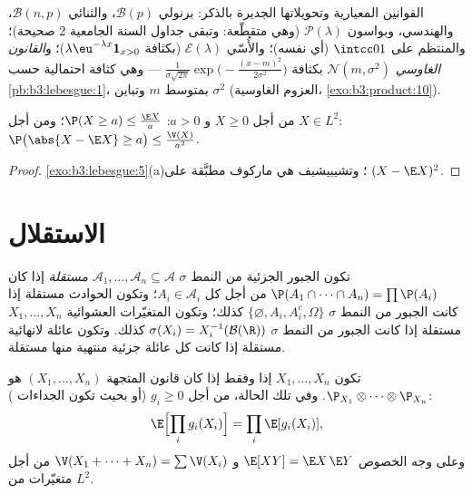 \begin{example}\label{ex:b3:probability:laws}
القوانين المعيارية وتحويلاتها الجديرة بالذكر: برنولي
$\mathcal B(p)$، والثنائي $\mathcal B(n, p)$، والهندسي، وبواسون $\mathcal P(\lambda)$
(وهي متقطّعة: وتبقى جداول السنة الجامعية 2 صحيحة)؛ والمنتظم
على $\intcc01$ (أي  نفسه)؛ والأُسّي $\mathcal E(\lambda)$ (بكثافة
$\lambda\eu^{-\lambda x}\mathbf 1_{x>0}$)؛ و\emph{القانون الغاوسي} $\mathcal N(m, \sigma^2)$
بكثافة $\frac1{\sigma\sqrt{2\pi}}\exp\bigl(-\frac{(x -
m)^2}{2\sigma^2}\bigr)$ --- وهي كثافة احتمالية حسب \cref{pb:b3:lebesgue:1}، بمتوسط $m$
وتباين $\sigma^2$ (العزوم الغاوسية، \cref{exo:b3:product:10}).
\end{example}

\begin{proposition}
\label{prop:b3:probability:markov}
من أجل $X \geq 0$ و $a > 0$: $\P(X \geq a) \leq \frac{\E
X}{a}$؛ ومن أجل $X \in L^2$:
$\P\bigl(\abs{X - \E X} \geq
a\bigr) \leq \frac{\V(X)}{a^2}$.
\end{proposition}

\begin{proof}
\cref{exo:b3:lebesgue:5}(a)؛ وتشيبيشيف هي ماركوف مطبَّقة على $(X - \E X)^2$.
\end{proof}

\section{الاستقلال}

\begin{definition}\label{def:b3:probability:independence}
تكون الجبور الجزئية من النمط $\sigma$ $\mathcal A_1, \dots, \mathcal A_n
\subseteq \mathcal A$
\emph{مستقلة} إذا كان $\P(A_1\cap\dots\cap A_n) = \prod\P(A_i)$ من أجل كل $A_i \in
\mathcal A_i$؛
وتكون الحوادث مستقلة إذا كانت الجبور من النمط $\sigma$ $\{\varnothing, A_i, A_i^c, \Omega\}$
كذلك؛ وتكون المتغيّرات العشوائية $X_1, \dots, X_n$ مستقلة إذا كانت الجبور
من النمط $\sigma$ $\sigma(X_i) =
X_i^{-1}(\mathcal B(\R))$ كذلك. وتكون عائلة لانهائية مستقلة إذا
كانت كل عائلة جزئية منتهية منها مستقلة.
\end{definition}

\begin{theorem}\label{thm:b3:probability:independence}
تكون $X_1, \dots, X_n$  إذا وفقط إذا كان قانون المتجهة $(X_1, \dots, X_n)$ هو
 $\P_{X_1}\otimes\cdots\otimes\P_{X_n}$. وفي تلك الحالة، من أجل $g_i \geq 0$ (أو
بحيث تكون الجداءات ):
\[
\E\Bigl[\prod_ig_i(X_i)\Bigr] = \prod_i\E[g_i(X_i)],
\]
وعلى وجه الخصوص $\E[XY] = \E X\,\E Y$ و $\V(X_1 + \dots +
X_n) = \sum\V(X_i)$ من أجل متغيّرات  من
$L^2$.
\end{theorem}

